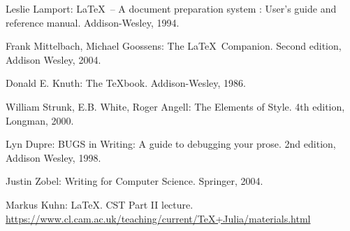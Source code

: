\begin{thebibliography}{6} %

Leslie Lamport: \LaTeX\ -- A document preparation
system : User's guide and reference manual. Addison-Wesley, 1994.

 Frank Mittelbach, Michael Goossens: The \LaTeX\
Companion. Second edition, Addison Wesley, 2004.

 Donald E. Knuth: The \TeX book. Ad\-dison-Wesley,
  1986.

 William Strunk, E.B. White, Roger Angell: The Elements
of Style. 4th edition, Longman, 2000.

 Lyn Dupre: BUGS in Writing: A guide to debugging your
prose. 2nd edition, Addison Wesley, 1998.

 Justin Zobel: Writing for Computer Science. Springer,
2004.

 Markus Kuhn: \LaTeX. CST Part II lecture.\\
\url{https://www.cl.cam.ac.uk/teaching/current/TeX+Julia/materials.html}

\end{thebibliography}